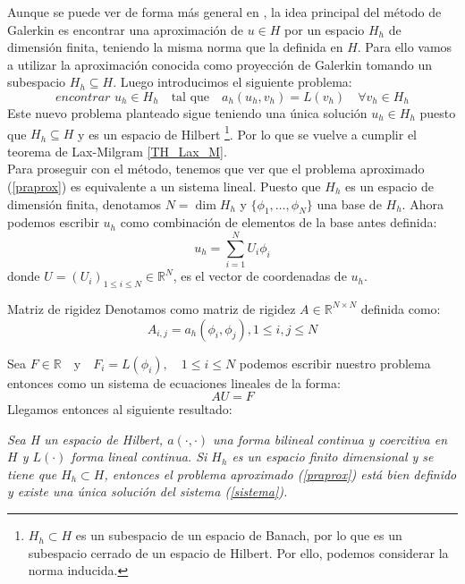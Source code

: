 Aunque se puede ver de forma más general en \cite{galerkin5}, la idea principal del método de Galerkin es encontrar una aproximación de $u\in H$ por un espacio $H_{h}$ de dimensión finita, teniendo la misma norma que la definida en $H$. Para ello vamos a utilizar la aproximación conocida como proyección de Galerkin tomando un subespacio $H_{h}\subseteq H$. Luego introducimos el siguiente problema:
\begin{equation}
\label{praprox}
    \textit{encontrar $u_{h}\in H_{h} \quad \mbox{tal que} \quad a_{h}(u_{h},v_{h})=L(v_{h}) \quad \forall v_{h}\in H_{h}$}
\end{equation}
Este nuevo problema planteado sigue teniendo una única solución $u_{h}\in H_{h} $ puesto que $H_{h}\subseteq H$ y es un espacio de Hilbert \footnote{$H_{h}\subset H$ es un subespacio de un espacio de Banach, por lo que es un subespacio cerrado de un espacio de Hilbert. Por ello, podemos considerar la norma inducida.}. Por lo que se vuelve a cumplir el teorema de Lax-Milgram \ref{TH_Lax_M}.\\

Para proseguir con el método, tenemos que ver que el problema aproximado (\ref{praprox}) es equivalente a un sistema lineal. Puesto que $H_{h}$ es un espacio de dimensión finita, denotamos $N=\dim{H_{h}}$ y $\{\phi _{1},\dots,\phi_{N}\}$ una base de $H_{h}$. Ahora podemos escribir $u_{h}$ como combinación de elementos de la base antes definida:
\begin{equation}
    u_{h}=\displaystyle\sum_{i=1}^{N}U_{i}\phi_{i}
\end{equation}
 donde $U=(U_{i})_{ 1 \leq i \leq N} \in \mathbb R^{N}$, es el vector de coordenadas de $u_{h}$.


\begin{definicion1}{Matriz de rigidez}
Denotamos como matriz de rigidez $A\in \mathbb R^{N \times N}$ definida como:
$$A_{i,j}=a_{h}(\phi_{i},\phi_{j}), 1\leq i,j\leq N$$
\end{definicion1}

Sea $F \in \mathbb R \quad \mbox{y} \quad F_{i}=L(\phi_{i}), \quad 1\leq i \leq N$ podemos escribir nuestro problema entonces como un sistema de ecuaciones lineales de la forma:
\begin{equation}
\label{sistema}
    AU=F
\end{equation}
Llegamos entonces al siguiente resultado:

\begin{proposicion1}
\textit{Sea H un espacio de Hilbert, $a(\cdot , \cdot)$ una forma bilineal continua y coercitiva en $H$ y $L(\cdot)$ forma lineal continua. Si $H_{h}$ es un espacio finito dimensional y se tiene que $H_{h} \subset H$, entonces el problema aproximado (\ref{praprox}) está bien definido y  existe una única solución del sistema (\ref{sistema}).}
\end{proposicion1}

